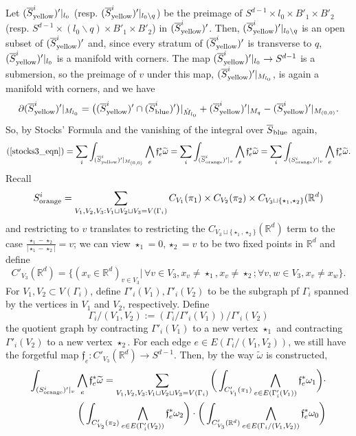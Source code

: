 \documentclass[11pt]{article}
\theoremstyle{definition}
\theoremstyle{remark}
\def\wt#1{\widetilde{#1}}
\def\ov#1{\overline{#1}}
\def\mr#1{{\mathring{#1}}}
\def\syellow{{\textnormal{yellow}}}
\def\sorange{{\textnormal{orange}}}
\def\sblue{{\textnormal{blue}}}
\def\R{\mathbb{R}}
\def\ff{\mathfrak{f}}
\begin{document}
Let $(\ov{S}_{\syellow}^i)'|_{l_0}$ (resp. $(\ov{S}_{\syellow}^i)'|_{l_0\backslash q}$) be the preimage of $S^{d-1}\times l_0\times B'_1\times B'_2$ (resp. $S^{d-1}\times (l_0\backslash q)\times B'_1\times B'_2$) in $(\ov{S}_{\syellow}^i)'$. 
Then, $(\ov{S}_{\syellow}^i)'|_{l_0\backslash q}$ is an open subset of $(\ov{S}_{\syellow}^i)'$ and, since every stratum of $(\ov{S}_{\syellow}^i)'$ is transverse to $q$, $(\ov{S}_{\syellow}^i)'|_{l_0}$ is a manifold with corners. 
The map $(\ov{S}_{\syellow}^i)'|_{l_0}\to S^{d-1}$ is a submersion, so the preimage of $v$ under this map, $(\ov{S}_{\syellow}^i)'|_{M_{l_0}}$, is again a manifold with corners, and we have 
$$\partial (\ov{S}_{\syellow}^i)'|_{M_{l_0}}=\big((\ov{S}_{\syellow}^i)'\cap(\ov{S}_{\sblue}^i)'\big)|_{\mr{M}_{l_0}}+(\ov{S}_{\syellow}^i)'|_{M_q}-(\ov{S}_{\syellow}^i)'|_{M_{(0,0)}}.$$
So, by Stocks' Formula and the vanishing of the integral over $\ov{S}_{\sblue}$ again, 
\begin{equation}\label{stocks4_eqn}
(\ref{stocks3_eqn})=\sum_i\int_{(\ov{S}_{\syellow}^i)'|_{M_{(0,0)}}}\bigwedge_e\ff_e^*\wt\omega=\sum_i\int_{(\ov{S}_{\sorange}^i)'|_v}\bigwedge_e\ff_e^*\wt\omega=\sum_i\int_{({S}_{\sorange}^i)'|_v}\bigwedge_e\ff_e^*\wt\omega.
\end{equation}
Recall 
$$S_{\sorange}^i=
\sum_{V_1,V_2,V_3:V_1\sqcup V_2\sqcup V_3=V(\Gamma_i)}
{C}_{V_1}(\pi_1)\times{C}_{V_2}(\pi_2)\times C_{V_3\sqcup\{\star_1,\star_2\}}(\R^d)$$
and restricting to $v$ translates to restricting the $C_{V_3\sqcup\{\star_1,\star_2\}}(\R^d)$ term to the case $\frac{\star_1-\star_2}{|\star_1-\star_2|}=v$; 
we can view $\star_1=0, \star_2=v$ to be two fixed points in $\R^d$ and define 
$$C'_{V_3}(\R^d)=\{(x_v\in\R^d)_{v\in V_3}|\,\forall v\in V_3,x_v\neq\star_1,x_v\neq \star_2;\forall v,w\in V_3,x_v\neq x_w\}.$$
For $V_1,V_2\subset V(\Gamma_i)$, define $\Gamma'_i(V_1),\Gamma'_i(V_2)$ to be the subgraph pf $\Gamma_i$ spanned by the vertices in $V_1$ and $V_2$, respectively.
Define
$$\Gamma_i/(V_1,V_2):=(\Gamma_i/\Gamma'_i(V_1))/\Gamma'_i(V_2)$$
the quotient graph by contracting $\Gamma'_i(V_1)$ to a new vertex $\star_1$ and contracting $\Gamma'_i(V_2)$ to a new vertex $\star_2$. 
For each edge $e\in E(\Gamma_i/(V_1,V_2))$, we still have the forgetful map $\ff_e:C'_{V_3}(\R^d)\to S^{d-1}$. 
Then, by the way $\wt\omega$ is constructed, 
\begin{align}\label{stocks5_eqn}
\int_{({S}_{\sorange}^i)'|_v}\bigwedge_e\ff_e^*\wt\omega=
\sum_{V_1,V_2,V_3:V_1\sqcup V_2\sqcup V_3=V(\Gamma_i)}
\bigg(\int_{C'_{V_1}(\pi_1)}\bigwedge_{e\in E(\Gamma'_i(V_1))}\ff_e^*\omega_1\bigg)\cdot \nonumber\\
\bigg(\int_{C'_{V_2}(\pi_2)}\bigwedge_{e\in E(\Gamma'_i(V_2))}\ff_e^*\omega_2\bigg)
\cdot
\bigg(\int_{C'_{V_3}(\R^d)}\bigwedge_{e\in E(\Gamma_i/(V_1,V_2))}\ff_e^*\omega_0\bigg)
\end{align}
\end{document}
